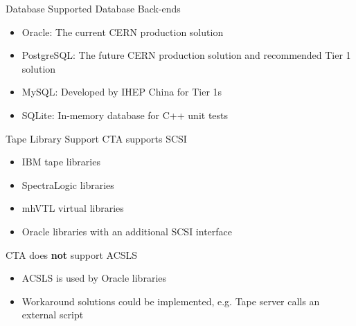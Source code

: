 \documentclass{beamer}
\begin{document}
\begin{frame}{Database}{}
   {\Large Supported Database Back-ends}\\[2ex]
   \begin{itemize}
      \item Oracle: The current CERN production solution
      \item PostgreSQL: The future CERN production solution and recommended Tier 1 solution
      \item MySQL: Developed by IHEP China for Tier 1s
      \item SQLite: In-memory database for C++ unit tests
   \end{itemize}
\end{frame}

\begin{frame}{Tape Library Support}{}
   {\Large CTA supports SCSI}
   \begin{itemize}
   \item IBM tape libraries
   \item SpectraLogic libraries
   \item mhVTL virtual libraries
   \item Oracle libraries with an additional SCSI interface\\[4ex]
   \end{itemize}
   {\Large CTA does \textbf{not} support ACSLS}
   \begin{itemize}
   \item ACSLS is used by Oracle libraries
   \item Workaround solutions could be implemented, e.g. Tape server calls an external script
   \end{itemize}
\end{frame}
\end{document}
